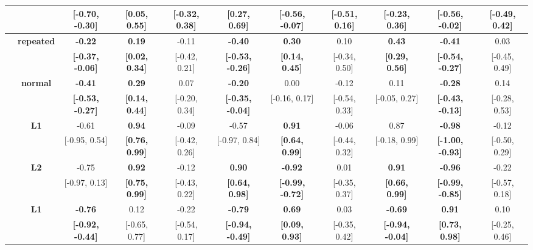 \begin{table}[ht]
{{\begin{tabular}{@{}>{\centering\arraybackslash}m{0.9cm}@{}c ccccccccc@{}}
\\
 &  & \rule{0pt}{2.2ex} \textbf{[-0.70, -0.30]} & \textbf{[0.05, 0.55]} & [-0.32, 0.38] & \textbf{[0.27, 0.69]} & \textbf{[-0.56, -0.07]} & [-0.51, 0.16] & [-0.23, 0.36] & \textbf{[-0.56, -0.02]} & [-0.49, 0.42]
\\
 \midrule
\multirow{4}{*}{\centering\rotatebox[origin=c]{90}{\textbf{OneStop}}} & \multirow{2}{*}{\textbf{repeated}} & \rule{0pt}{2.2ex} \textbf{-0.22} & \textbf{0.19} & -0.11 & \textbf{-0.40} & \textbf{0.30} & 0.10 & \textbf{0.43} & \textbf{-0.41} & 0.03
\\
 &  & \rule{0pt}{2.2ex} \textbf{[-0.37, -0.06]} & \textbf{[0.02, 0.34]} & [-0.42, 0.21] & \textbf{[-0.53, -0.26]} & \textbf{[0.14, 0.45]} & [-0.34, 0.50] & \textbf{[0.29, 0.56]} & \textbf{[-0.54, -0.27]} & [-0.45, 0.49]
\\
\addlinespace[6pt]
 & \multirow{2}{*}{\textbf{normal}} & \rule{0pt}{2.2ex} \textbf{-0.41} & \textbf{0.29} & 0.07 & \textbf{-0.20} & 0.00 & -0.12 & 0.11 & \textbf{-0.28} & 0.14
\\
 &  & \rule{0pt}{2.2ex} \textbf{[-0.53, -0.27]} & \textbf{[0.14, 0.44]} & [-0.20, 0.34] & \textbf{[-0.35, -0.04]} & [-0.16, 0.17] & [-0.54, 0.33] & [-0.05, 0.27] & \textbf{[-0.43, -0.13]} & [-0.28, 0.53]
\\
 \midrule
\multirow{4}{*}{\centering\rotatebox[origin=c]{90}{\textbf{GECO-NL}}} & \multirow{2}{*}{\textbf{L1}} & \rule{0pt}{2.2ex} -0.61 & \textbf{0.94} & -0.09 & -0.57 & \textbf{0.91} & -0.06 & 0.87 & \textbf{-0.98} & -0.12
\\
 &  & \rule{0pt}{2.2ex} [-0.95, 0.54] & \textbf{[0.76, 0.99]} & [-0.42, 0.26] & [-0.97, 0.84] & \textbf{[0.64, 0.99]} & [-0.44, 0.32] & [-0.18, 0.99] & \textbf{[-1.00, -0.93]} & [-0.50, 0.29]
\\
\addlinespace[6pt]
 & \multirow{2}{*}{\textbf{L2}} & \rule{0pt}{2.2ex} -0.75 & \textbf{0.92} & -0.12 & \textbf{0.90} & \textbf{-0.92} & 0.01 & \textbf{0.91} & \textbf{-0.96} & -0.22
\\
 &  & \rule{0pt}{2.2ex} [-0.97, 0.13] & \textbf{[0.75, 0.99]} & [-0.43, 0.22] & \textbf{[0.64, 0.98]} & \textbf{[-0.99, -0.72]} & [-0.35, 0.37] & \textbf{[0.66, 0.99]} & \textbf{[-0.99, -0.85]} & [-0.57, 0.18]
\\
 \midrule
\multirow{4}{*}{\centering\rotatebox[origin=c]{90}{\textbf{GECO-ZH}}} & \multirow{2}{*}{\textbf{L1}} & \rule{0pt}{2.2ex} \textbf{-0.76} & 0.12 & -0.22 & \textbf{-0.79} & \textbf{0.69} & 0.03 & \textbf{-0.69} & \textbf{0.91} & 0.10
\\
 &  & \rule{0pt}{2.2ex} \textbf{[-0.92, -0.44]} & [-0.65, 0.77] & [-0.54, 0.17] & \textbf{[-0.94, -0.49]} & \textbf{[0.09, 0.93]} & [-0.35, 0.42] & \textbf{[-0.94, -0.04]} & \textbf{[0.73, 0.98]} & [-0.25, 0.46]

\end{tabular}}}
\end{table}
